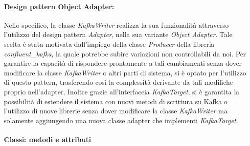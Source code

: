 \paragraph{Design pattern Object Adapter:}
Nello specifico, la classe \textit{KafkaWriter} realizza la sua funzionalità attraverso l'utilizzo del design pattern \textit{Adapter}, nella sua variante \textit{Object Adapter}. Tale scelta è stata motivata dall'impiego della classe \textit{Producer} della libreria \textit{confluent\_kafka}, la quale potrebbe subire variazioni non controllabili da noi. Per garantire la capacità di rispondere prontamente a tali cambiamenti senza dover modificare la classe \textit{KafkaWriter} o altri parti di sistema, si è optato per l'utilizzo di questo pattern, trasferendo così la complessità derivante da tali modifiche proprio nell'adapter.
Inoltre grazie all'interfaccia \textit{KafkaTarget}, si è garantita la possibilità di estendere il sistema con nuovi metodi di scrittura su Kafka o l'utilizzo di nuove librerie senza dover modificare la classe \textit{KafkaWriter} ma solamente aggiungendo una nuova classe adapter che implementi \textit{KafkaTarget}.



\paragraph{Classi: metodi e attributi}

